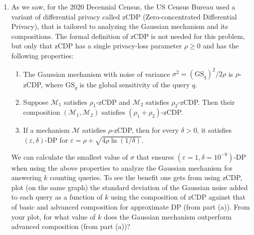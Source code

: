 \documentclass[11pt]{article}
\begin{document}
\begin{enumerate}[leftmargin=*]
\begin{enumerate}
			\item
			As we saw, for the 2020 Decennial Census, the US Census Bureau used a variant of differential privacy called zCDP
			(Zero-concentrated Differential Privacy), that is tailored to analyzing the Gaussian mechanism and its compositions. The formal definition of zCDP is not needed for this problem, but only that zCDP has a single privacy-loss parameter $\rho\geq 0$ and has the following properties:
			\begin{enumerate}
				\item The Gaussian mechanism with noise of variance $\sigma^2 = (\mathrm{GS}_q)^2/2\rho$ is $\rho$-zCDP, where
				$\mathrm{GS}_q$ is the global sensitivity of the query
				$q$.
				\item Suppose $\mathcal{M}_1$ satisfies $\rho_1$-zCDP and $\mathcal{M}_2$ satisfies $\rho_2$-zCDP. Then their composition $(\mathcal{M}_1, \mathcal{M}_2)$ satisfies $(\rho_1+\rho_2)$-zCDP.
				\item If a mechanism $\mathcal{M}$ satisfies $\rho$-zCDP, then for every $\delta>0$, it satisfies $(\varepsilon,\delta)$-DP for  $\varepsilon=\rho+\sqrt{4\rho\ln(1/\delta)}.$
			\end{enumerate}
			We can calculate the smallest value of $\sigma$ that ensures $(\varepsilon=1,\delta=10^{-9})$-DP when using the above properties to analyze the Gaussian mechanism for answering $k$ counting queries. To see the benefit one gets from
			using zCDP, plot (on the same graph) the standard deviation of the Gaussian noise added to each query as a function of $k$ using the composition of zCDP against that of basic and advanced composition for approximate DP (from part (a)).
			From your plot, for what value of $k$ does the Gaussian mechanism outperform advanced composition (from part (a))?
		\end{enumerate}
		
	\end{enumerate}
	
\end{document}
